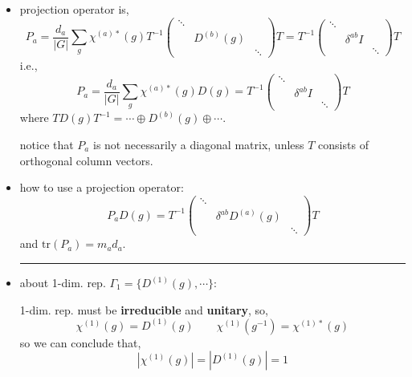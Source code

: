 \begin{itemize}
	\item projection operator is,
	\begin{equation}
		P_a = \frac{d_a}{|G|} \sum_g \chi^{(a) *}(g) T^{-1} \begin{pmatrix}
			\ddots & & \\
			& D^{(b)}(g) & \\
			& & \ddots
		\end{pmatrix} T = T^{-1} \begin{pmatrix}
			\ddots & & \\
			& \delta^{a b} I & \\
			&  & \ddots
		\end{pmatrix} T
	\end{equation}
	i.e.,
	\begin{equation}
		P_a = \frac{d_a}{|G|} \sum_g \chi^{(a) *}(g) D(g) = T^{-1} \begin{pmatrix}
			\ddots & & \\
			& \delta^{a b} I & \\
			&  & \ddots
		\end{pmatrix} T
	\end{equation}
	where $T D(g) T^{-1} = \cdots \oplus D^{(b)}(g) \oplus \cdots$.
	
	notice that $P_a$ is not necessarily a diagonal matrix, unless $T$ consists of orthogonal column vectors.
	
	
	\item how to use a projection operator:
	\begin{equation}
		P_a D(g) = T^{-1} \begin{pmatrix} \ddots & & \\ & \delta^{a b} D^{(a)}(g) & \\ & & \ddots \end{pmatrix} T
	\end{equation}
	and $\mathrm{tr}(P_a) = m_a d_a$.
	
	\noindent\rule[0.5ex]{\linewidth}{0.5pt} %
	
	\item about 1-dim. rep. $\Gamma_1 = \{D^{(1)}(g), \cdots\}$:
	
	1-dim. rep. must be \textbf{irreducible} and \textbf{unitary}, so,
	\begin{equation}
		\chi^{(1)}(g) = D^{(1)}(g) \qquad \chi^{(1)}(g^{-1}) = \chi^{(1) *}(g)
	\end{equation}
	so we can conclude that,
	\begin{equation}
		|\chi^{(1)}(g)| = |D^{(1)}(g)| = 1
	\end{equation}
	

\end{itemize}
